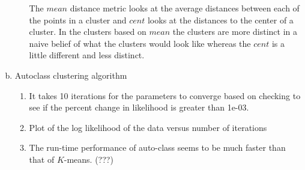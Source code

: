 \documentclass[11pt]{article}
\begin{document}
\begin{enumerate}[a.]
\begin{enumerate}
\begin{enumerate}
\begin{itemize}
	\end{itemize}
\end{enumerate}
The $mean$ distance metric looks at the average distances between each of the points in a cluster and $cent$ looks at the distances to the center of a cluster. In the clusters based on $mean$ the clusters are more distinct in a naive belief of what the clusters would look like whereas the $cent$ is a little different and less distinct.
\end{enumerate}

\item Autoclass clustering algorithm
\begin{enumerate}
\item It takes 10 iterations for the parameters to converge based on checking to see if the percent change in likelihood is greater than 1e-03.
\item Plot of the log likelihood of the data versus number of iterations
\item The run-time performance of auto-class seems to be much faster than that of $K$-means. (???)
\end{enumerate}
\end{enumerate}
\end{document}
